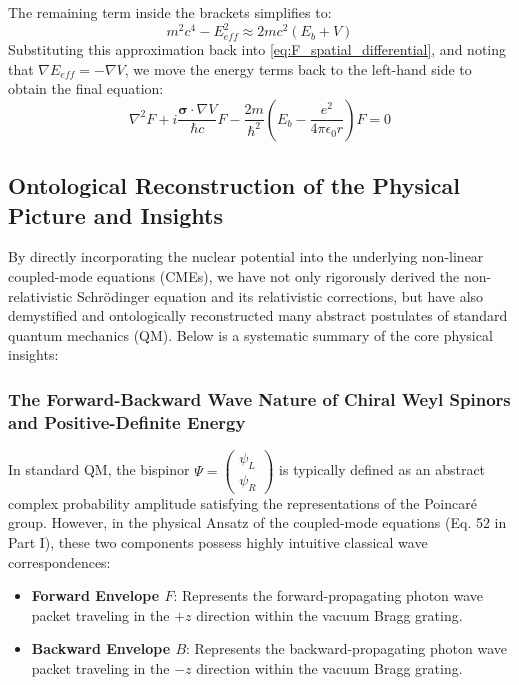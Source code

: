 \documentclass[12pt, a4paper]{article}
\begin{document}
The remaining term inside the brackets simplifies to:
\begin{equation}
    m^2 c^4 - E_{eff}^2 \approx 2mc^2(E_b + V)
\end{equation}
Substituting this approximation back into \eqref{eq:F_spatial_differential}, and noting that $\nabla E_{eff} = -\nabla V$, we move the energy terms back to the left-hand side to obtain the final equation:
\begin{equation}
    \nabla^2 F + i\frac{\boldsymbol{\sigma} \cdot \nabla V}{\hbar c} F - \frac{2m}{\hbar^2}\left( E_b - \frac{e^2}{4\pi\epsilon_0 r} \right) F = 0 \label{eq:Schrodinger_and_SO}
\end{equation}

\subsection{Ontological Reconstruction of the Physical Picture and Insights}

By directly incorporating the nuclear potential into the underlying non-linear coupled-mode equations (CMEs), we have not only rigorously derived the non-relativistic Schrödinger equation and its relativistic corrections, but have also demystified and ontologically reconstructed many abstract postulates of standard quantum mechanics (QM). Below is a systematic summary of the core physical insights:

\subsubsection{The Forward-Backward Wave Nature of Chiral Weyl Spinors and Positive-Definite Energy}

In standard QM, the bispinor $\Psi = \begin{pmatrix} \psi_L \\ \psi_R \end{pmatrix}$ is typically defined as an abstract complex probability amplitude satisfying the representations of the Poincaré group. However, in the physical Ansatz of the coupled-mode equations (Eq. 52 in Part I), these two components possess highly intuitive classical wave correspondences:
\begin{itemize}
    \item \textbf{Forward Envelope $F$}: Represents the forward-propagating photon wave packet traveling in the $+z$ direction within the vacuum Bragg grating.
    \item \textbf{Backward Envelope $B$}: Represents the backward-propagating photon wave packet traveling in the $-z$ direction within the vacuum Bragg grating.
\end{itemize}
\end{document}
